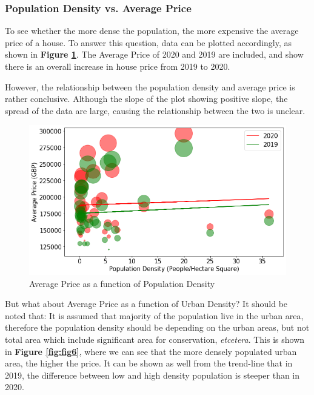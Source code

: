 \documentclass{homeworg}
\begin{document}
\subsubsection{Population Density vs. Average Price}
To see whether the more dense the population, the more expensive the average price of a house. To answer this question, data can be plotted accordingly, as shown in  \textbf{Figure \ref{fig:fig5}}. The Average Price of 2020 and 2019 are included, and show there is an overall increase in house price from 2019 to 2020.\par However, the relationship between the population density and average price is rather conclusive. Although the slope of the plot showing positive slope, the spread of the data are large, causing the relationship between the two is unclear.\par
\begin{figure}[!h]
    \centering
    \includegraphics[scale=0.6]{figure/Figure_5_Not_so_Obvious_PopulationDensityVSAveragePrice.png}
    \caption{Average Price as a function of Population Density}
    \label{fig:fig5}
\end{figure}
\FloatBarrier
But what about Average Price as a function of Urban Density? It should be noted that: It is assumed that majority of the population live in the urban area, therefore the population density should be depending on the urban areas, but not total area which include significant area for conservation, \textit{etcetera}. This is shown in \textbf{Figure \ref{fig:fig6}}, where we can see that the more densely populated urban area, the higher the price. It can be shown as well from the trend-line that in 2019, the difference between low and high density population is steeper than in 2020.\par
\end{document}
